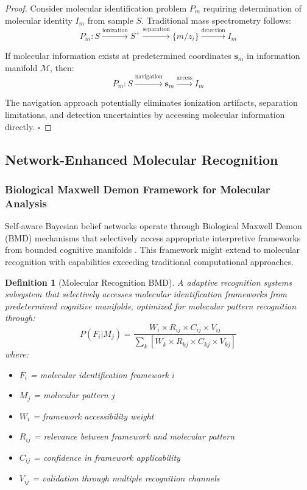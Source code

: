 \documentclass[11pt,a4paper]{article}
\newtheorem{definition}[theorem]{Definition}
\theoremstyle{remark}
\begin{document}
\begin{proof}
Consider molecular identification problem $P_m$ requiring determination of molecular identity $I_m$ from sample $S$. Traditional mass spectrometry follows:
$$P_m: S \xrightarrow{\text{ionization}} S^+ \xrightarrow{\text{separation}} \{m/z_i\} \xrightarrow{\text{detection}} I_m$$

If molecular information exists at predetermined coordinates $\mathbf{s}_m$ in information manifold $\mathcal{M}$, then:
$$P_m: S \xrightarrow{\text{navigation}} \mathbf{s}_m \xrightarrow{\text{access}} I_m$$

The navigation approach potentially eliminates ionization artifacts, separation limitations, and detection uncertainties by accessing molecular information directly. $\square$
\end{proof}

\subsection{Network-Enhanced Molecular Recognition}

\subsubsection{Biological Maxwell Demon Framework for Molecular Analysis}

Self-aware Bayesian belief networks operate through Biological Maxwell Demon (BMD) mechanisms that selectively access appropriate interpretive frameworks from bounded cognitive manifolds \cite{sachikonye2024consciousness}. This framework might extend to molecular recognition with capabilities exceeding traditional computational approaches.

\begin{definition}[Molecular Recognition BMD]
A adaptive recognition systems subsystem that selectively accesses molecular identification frameworks from predetermined cognitive manifolds, optimized for molecular pattern recognition through:
$$P(F_i|M_j) = \frac{W_i \times R_{ij} \times C_{ij} \times V_{ij}}{\sum_k[W_k \times R_{kj} \times C_{kj} \times V_{kj}]}$$
where:
\begin{itemize}
\item $F_i$ = molecular identification framework $i$
\item $M_j$ = molecular pattern $j$
\item $W_i$ = framework accessibility weight
\item $R_{ij}$ = relevance between framework and molecular pattern
\item $C_{ij}$ = confidence in framework applicability
\item $V_{ij}$ = validation through multiple recognition channels
\end{itemize}
\end{definition}
\end{document}
